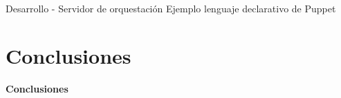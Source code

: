 \begin{frame}{Desarrollo - Servidor de orquestación}
    \vspace{0cm} {Ejemplo lenguaje declarativo de Puppet}
    \vspace{0cm}
    \begin{figure}[ht]
       \centering
    \end{figure}

\end{frame}
\section{Conclusiones}
\begin{frame}
    \Huge
    \centering
    \textbf{Conclusiones}

\end{frame}

